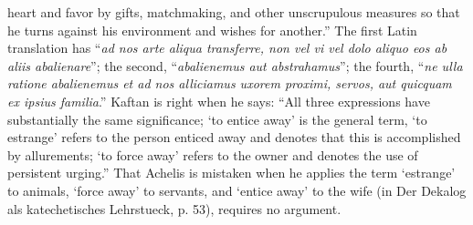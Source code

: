 heart and favor by gifts, matchmaking, and other unscrupulous measures so that he turns against his environment and wishes for another.” The first Latin translation has “\emph{ad nos arte aliqua transferre, non vel vi vel dolo aliquo eos ab aliis abalienare}”; the second, “\emph{abalienemus aut abstrahamus}”; the fourth, “\emph{ne ulla ratione abalienemus et ad nos alliciamus uxorem proximi, servos, aut quicquam ex ipsius familia}.” Kaftan is right when he says: “All three expressions have substantially the same significance; ‘to entice away’ is the general term, ‘to estrange’ refers to the person enticed away and denotes that this is accomplished by allurements; ‘to force away’ refers to the owner and denotes the use of persistent urging.” That Achelis is mistaken when he applies the term ‘estrange’ to animals, ‘force away’ to servants, and ‘entice away’ to the wife (in Der Dekalog als katechetisches Lehrstueck, p. 53), requires no argument.


